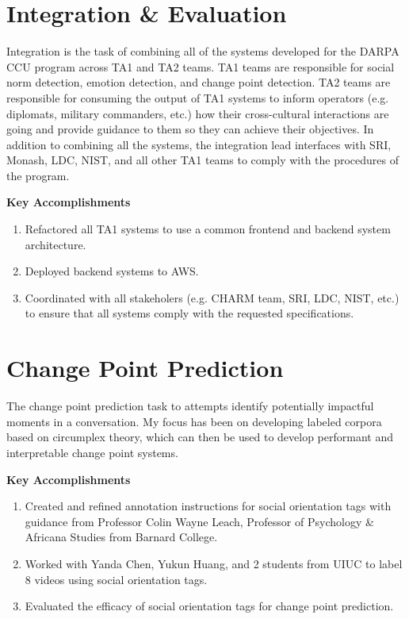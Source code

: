 \documentclass[12pt]{article}
\begin{document}
\section{Integration \& Evaluation}
Integration is the task of combining all of the systems developed for the DARPA CCU program across TA1 and TA2 teams. TA1 teams are responsible for social norm detection, emotion detection, and change point detection. TA2 teams are responsible for consuming the output of TA1 systems to inform operators (e.g. diplomats, military commanders, etc.) how their cross-cultural interactions are going and provide guidance to them so they can achieve their objectives. In addition to combining all the systems, the integration lead interfaces with SRI, Monash, LDC, NIST, and all other TA1 teams to comply with the procedures of the program.

\textbf{Key Accomplishments}
\begin{enumerate}
    \item Refactored all TA1 systems to use a common frontend and backend system architecture.
    \item Deployed backend systems to AWS.
    \item Coordinated with all stakeholers (e.g. CHARM team, SRI, LDC, NIST, etc.) to ensure that all systems comply with the requested specifications.
\end{enumerate}

\section{Change Point Prediction}
The change point prediction task to attempts identify potentially impactful moments in a conversation. My focus has been on developing labeled corpora based on circumplex theory, which can then be used to develop performant and interpretable change point systems.

\textbf{Key Accomplishments}
\begin{enumerate}
    \item Created and refined annotation instructions for social orientation tags with guidance from Professor Colin Wayne Leach, Professor of Psychology \& Africana Studies from Barnard College.
    \item Worked with Yanda Chen, Yukun Huang, and 2 students from UIUC to label 8 videos using social orientation tags.
    \item Evaluated the efficacy of social orientation tags for change point prediction.
\end{enumerate}
\end{document}
